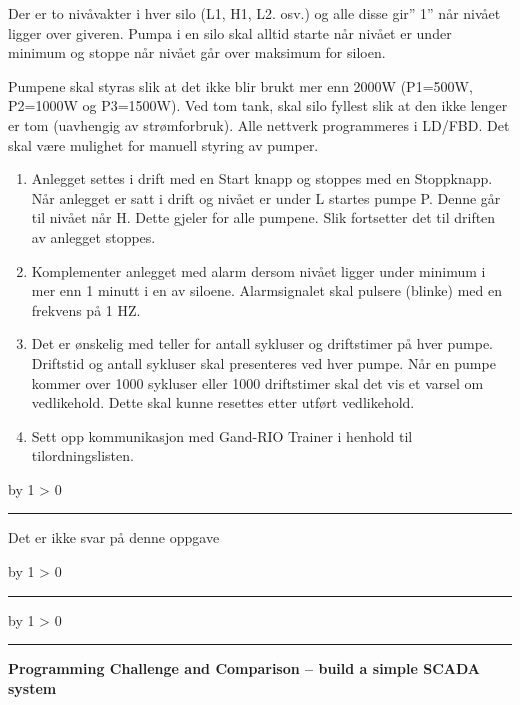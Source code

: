 \documentclass[12pt,a4paper]{article}
\def\oppgave{
            \advance\questnum by 1
            \ifnum \questnum > 0
                 \hrule
                 \vskip 3pt
                 \leftline{Oppgave \the\questnum}
                 \vskip 3pt \fi}
\def\svar{
           \advance\answnum by 1
           \ifnum \answnum > 0
                \hrule
                \vskip 3pt
                \leftline{Svar \the\answnum}
                \vskip 3pt \fi}
\def\notes{
           \advance\explnum by 1
           \ifnum \explnum > 0
                \hrule
                \vskip 3pt
                \leftline{Notes \the\explnum}
                \vskip 3pt \fi}
\begin{document}
Der er to nivåvakter i hver silo (L1, H1, L2. osv.) og alle disse
gir\textquotedblright{} 1\textquotedblright{} når nivået ligger over
giveren. Pumpa i en silo skal alltid starte når nivået er under minimum
og stoppe når nivået går over maksimum for siloen.

Pumpene skal styras slik at det ikke blir brukt mer enn 2000W (P1=500W,
P2=1000W og P3=1500W). Ved tom tank, skal silo fyllest slik at den
ikke lenger er tom (uavhengig av strømforbruk). Alle nettverk programmeres
i LD/FBD. Det skal være mulighet for manuell styring av pumper. 
\begin{enumerate}
\item Anlegget settes i drift med en Start knapp og stoppes med en Stoppknapp.
Når anlegget er satt i drift og nivået er under L startes pumpe P.
Denne går til nivået når H. Dette gjeler for alle pumpene. Slik fortsetter
det til driften av anlegget stoppes. 
\item Komplementer anlegget med alarm dersom nivået ligger under minimum
i mer enn 1 minutt i en av siloene. Alarmsignalet skal pulsere (blinke)
med en frekvens på 1 HZ. 
\item Det er ønskelig med teller for antall sykluser og driftstimer på hver
pumpe. Driftstid og antall sykluser skal presenteres ved hver pumpe.
Når en pumpe kommer over 1000 sykluser eller 1000 driftstimer skal
det vis et varsel om vedlikehold. Dette skal kunne resettes etter
utført vedlikehold. 
\item Sett opp kommunikasjon med Gand-RIO Trainer i henhold til tilordningslisten.
\end{enumerate}
\vskip 10pt
\vskip 10pt \filbreak 





\svar{} 
Det er ikke svar på denne oppgave
\vskip 10pt \filbreak 





\notes{} 



\vfil \eject 





\oppgave{} 

\noindent
{\bf Programming Challenge and Comparison -- build a simple SCADA system} 
\end{document}
